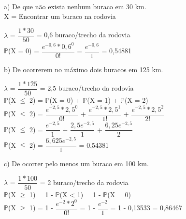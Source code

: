 \documentclass[12pt,a4paper]{article}
\begin{document}
	a) De que não exista nenhum buraco em 30 km.
	\vspace{0.5cm}\\
	X = Encontrar um buraco na rodovia
	\begin{center}
		\vspace{0.5cm}
		$\lambda$ = $\dfrac{1 * 30}{50}$ = 0,6 buraco/trecho da rodovia
		\vspace{1cm}\\
		$\mathbb{P}$(X = 0) = $\dfrac{e^{-0,6} * 0,6^{0}}{0!}$ = $\dfrac{e^{-0,6}}{1}$ = 0,54881
	\end{center}
	\vspace{1cm}
	b) De ocorrerem no máximo dois buracos em 125 km.
	\begin{center}
		\vspace{0.5cm}
		$\lambda$ = $\dfrac{1 * 125}{50}$ = 2,5 buraco/trecho da rodovia
		\vspace{1cm}\\
		$\mathbb{P}$(X $\leq$ 2) = $\mathbb{P}$(X = 0) + $\mathbb{P}$(X = 1) + $\mathbb{P}$(X = 2)
		\vspace{1cm}\\
		$\mathbb{P}$(X $\leq$ 2) = $\dfrac{e^{-2,5} * 2,5^{0}}{0!}$ + $\dfrac{e^{-2,5} * 2,5^{1}}{1!}$ + $\dfrac{e^{-2,5} * 2,5^{2}}{2!}$
		\vspace{1cm}\\
		$\mathbb{P}$(X $\leq$ 2) = $\dfrac{e^{-2,5}}{1}$ + $\dfrac{2,5e^{-2,5}}{1}$ + $\dfrac{6,25e^{-2,5}}{2}$
		\vspace{1cm}\\
		$\mathbb{P}$(X $\leq$ 2) = $\dfrac{6,625e^{-2,5}}{1}$ = 0,54381
	\end{center}
	c) De ocorrer pelo menos um buraco em 100 km.
	\begin{center}
		\vspace{0.5cm}
		$\lambda$ = $\dfrac{1 * 100}{50}$ = 2 buraco/trecho da rodovia
		\vspace{1cm}\\
		$\mathbb{P}$(X $\geq$ 1) = 1 - $\mathbb{P}$(X < 1) = 1 - $\mathbb{P}$(X = 0)
		\vspace{1cm}\\
		$\mathbb{P}$(X $\geq$ 1) = 1 - $\dfrac{e^{-2} * 2^0}{0!}$ = 1 - $\dfrac{e^{-2}}{1}$ = 1 - 0,13533 = 0,86467
	\end{center}
\end{document}
